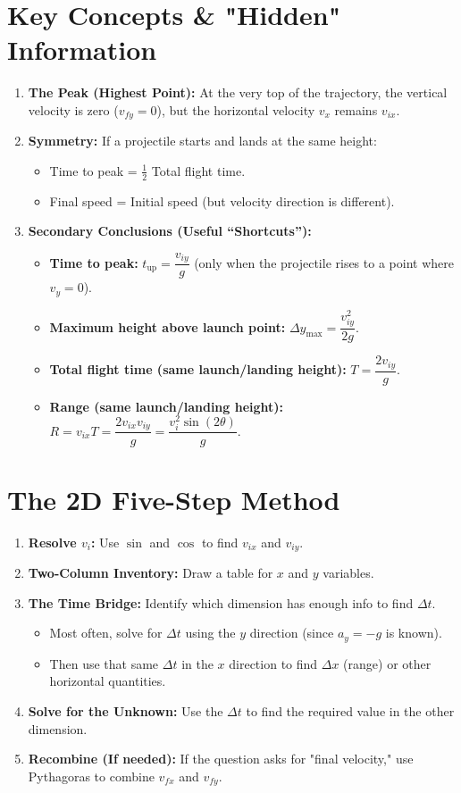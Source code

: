 \documentclass{article}
\begin{document}
\section{Key Concepts \& "Hidden" Information}
\begin{enumerate}
  \item \textbf{The Peak (Highest Point):} At the very top of the trajectory, the vertical velocity is zero ($v_{fy} = 0$), but the horizontal velocity $v_x$ remains $v_{ix}$.
  \item \textbf{Symmetry:} If a projectile starts and lands at the same height:
    \begin{itemize}
      \item Time to peak = $\frac{1}{2}$ Total flight time.
      \item Final speed = Initial speed (but velocity direction is different).
    \end{itemize}
  \item \textbf{Secondary Conclusions (Useful ``Shortcuts''):}
    \begin{itemize}
      \item \textbf{Time to peak:} $t_{\text{up}} = \dfrac{v_{iy}}{g}$ (only when the projectile rises to a point where $v_y=0$).
      \item \textbf{Maximum height above launch point:} $\Delta y_{\max} = \dfrac{v_{iy}^2}{2g}$.
      \item \textbf{Total flight time (same launch/landing height):} $T = \dfrac{2v_{iy}}{g}$.
      \item \textbf{Range (same launch/landing height):} $R = v_{ix}T = \dfrac{2v_{ix}v_{iy}}{g} = \dfrac{v_i^2\sin(2\theta)}{g}$.
    \end{itemize}

\end{enumerate}

\newpage
\section{The 2D Five-Step Method}
\begin{enumerate}
  \item \textbf{Resolve $v_i$:} Use $\sin$ and $\cos$ to find $v_{ix}$ and $v_{iy}$.
  \item \textbf{Two-Column Inventory:} Draw a table for $x$ and $y$ variables.
  \item \textbf{The Time Bridge:} Identify which dimension has enough info to find $\Delta t$.
    \begin{itemize}
      \item Most often, solve for $\Delta t$ using the $y$ direction (since $a_y=-g$ is known).
      \item Then use that same $\Delta t$ in the $x$ direction to find $\Delta x$ (range) or other horizontal quantities.
    \end{itemize}
  \item \textbf{Solve for the Unknown:} Use the $\Delta t$ to find the required value in the other dimension.
  \item \textbf{Recombine (If needed):} If the question asks for "final velocity," use Pythagoras to combine $v_{fx}$ and $v_{fy}$.
\end{enumerate}
\end{document}
